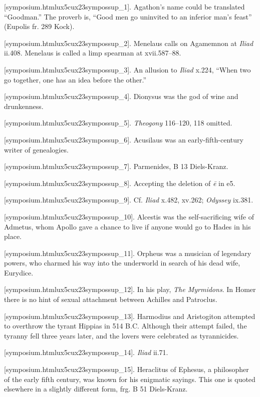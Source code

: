 [symposium.htmlux5cux23sympossup_1]. Agathon's name could be
translated “Goodman.” The proverb is, “Good men go uninvited to an
inferior man's feast” (Eupolis fr. 289 Kock).

[symposium.htmlux5cux23sympossup_2]. Menelaus calls on Agamemnon
at {\em Iliad} ii.408. Menelaus is called a limp spearman at
xvii.587--88.

[symposium.htmlux5cux23sympossup_3]. An allusion to {\em Iliad}
x.224, “When two go together, one has an idea before the other.”

[symposium.htmlux5cux23sympossup_4]. Dionysus was the god of
wine and drunkenness.

[symposium.htmlux5cux23sympossup_5]. {\em Theogony} 116--120,
118 omitted.

[symposium.htmlux5cux23sympossup_6]. Acusilaus was an
early-fifth-century writer of genealogies.

[symposium.htmlux5cux23sympossup_7]. Parmenides, B 13
Diels-Kranz.

[symposium.htmlux5cux23sympossup_8]. Accepting the deletion of
{\em ē} in e5.

[symposium.htmlux5cux23sympossup_9]. Cf. {\em Iliad} x.482,
xv.262; {\em Odyssey} ix.381.

[symposium.htmlux5cux23sympossup_10]. Alcestis was the
self-sacrificing wife of Admetus, whom Apollo gave a chance to live if
anyone would go to Hades in his place.

[symposium.htmlux5cux23sympossup_11]. Orpheus was a musician of
legendary powers, who charmed his way into the underworld in search of
his dead wife, Eurydice.

[symposium.htmlux5cux23sympossup_12]. In his play, {\em The
Myrmidons}. In Homer there is no hint of sexual attachment between
Achilles and Patroclus.

[symposium.htmlux5cux23sympossup_13]. Harmodius and Aristogiton
attempted to overthrow the tyrant Hippias in 514 B.C. Although their
attempt failed, the tyranny fell three years later, and the lovers were
celebrated as tyrannicides.

[symposium.htmlux5cux23sympossup_14]. {\em Iliad} ii.71.

[symposium.htmlux5cux23sympossup_15]. Heraclitus of Ephesus, a
philosopher of the early fifth century, was known for his enigmatic
sayings. This one is quoted elsewhere in a slightly different form, frg.
B 51 Diels-Kranz.

